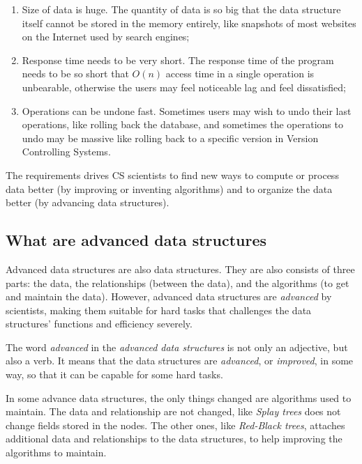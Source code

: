 \documentclass[scheme=plain,12pt]{ctexart}
\begin{document}
    \begin{enumerate}
        \item Size of data is huge. The quantity of data is so big that the data structure itself
              cannot be stored in the memory entirely, like snapshots of most websites on the
              Internet used by search engines;
        \item Response time needs to be very short. The response time of the program needs to be
              so short that $O(n)$ access time in a single operation is unbearable, otherwise the
              users may feel noticeable lag and feel dissatisfied;
        \item Operations can be undone fast. Sometimes users may wish to undo their last operations,
              like rolling back the database, and sometimes the operations to undo may be massive
              like rolling back to a specific version in Version Controlling Systems.
    \end{enumerate}
    
    The requirements drives CS scientists to find new ways to compute or process data better (by
    improving or inventing algorithms) and to organize the data better (by advancing data
    structures).

    \subsection{What are advanced data structures}

    Advanced data structures are also data structures. They are also consists of three parts:
    the data, the relationships (between the data), and the algorithms (to get and maintain the
    data). However, advanced data structures are \emph{advanced} by scientists, making them
    suitable for hard tasks that challenges the data structures' functions and efficiency severely.

    The word \emph{advanced} in the \emph{advanced data structures} is not only an adjective,
    but also a verb. It means that the data structures are \emph{advanced}, or \emph{improved},
    in some way, so that it can be capable for some hard tasks.

    In some advance data structures, the only things changed are algorithms used to maintain.
    The data and relationship are not changed, like \emph{Splay trees} does not change fields
    stored in the nodes. The other ones, like \emph{Red-Black trees}, attaches additional data
    and relationships to the data structures, to help improving the algorithms to maintain.
\end{document}
